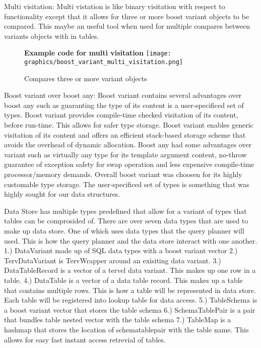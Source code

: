 \documentclass[letterpaper, 12pt]{article}
\begin{document}
Multi visitation:
Multi vistation is like binary visitation with respect to functionality except that it allows for
three or more boost variant objects to be compared. This maybe an useful tool when used for
multiple compares between variants objects with in tables.

\begin{figure}
  \centering
  \textbf{Example code for multi visitation}
  \texttt{[image: graphics/boost\_variant\_multi\_visitation.png]}
  \caption{Compares three or more variant objects}
\end{figure}

Boost variant over boost any:
Boost variant contains several advantages over boost any such as guaranting the type of its
content is a user-specificed set of types. Boost variant provides compile-time checked
visitation of its content, before run-time. This allows for safer type storage. Boost variant
enables generic visitation of its content and offers an efficient stack-based storage scheme
that avoids the overhead of dynamic allocation. Boost any had some advantages over variant such
as virtually any type for its template argument content, no-throw guarantee of exception safety
for swap operation and less expensive compile-time processor/memory demands. Overall boost
variant was choosen for its highly customable type storage. The user-specificed set of types
is something that was highly sought for our data structures.
\par\vspace{\baselineskip}

	Data Store has multiple types predefined that allow for a variant of types that tables can be
	comprosided of. There are over seven data types that are used to make up data store. One of which
	uses data types that the query planner will used. This is how the query planner and the data store
	interact with one another.
1.) DataVariant made up of SQL data types with a boost variant vector
2.)	TervDataVariant is TervWrapper around an exisiting data variant.
3.)	DataTableRecord is a vector of a tervel data variant. This makes up one row in
	a table.
4.)	DataTable is a vector of a data table record. This makes up a table that contains multiple rows.
	This is how a table will be represented in data store. Each table will be registered into lookup table
	for data access.
5.)	TableSchema is a boost variant vector that stores the table schema
6.)	SchemaTablePair is a pair that bundles table nested vector with the table schema
7.)	TableMap is a hashmap that stores the location of schematablepair with the table name. This
	allows for easy fast instant access retrevial of tables.
\end{document}
